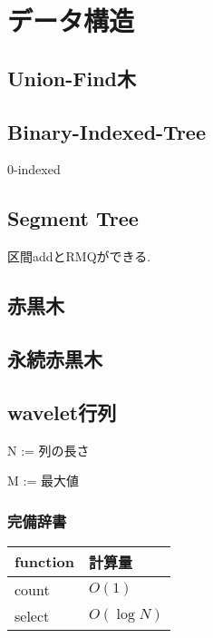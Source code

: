 \section{データ構造}
\subsection{Union-Find木}

\subsection{Binary-Indexed-Tree}
0-indexed

\subsection{Segment Tree}
区間addとRMQができる.

\subsection{赤黒木}

\subsection{永続赤黒木}

\subsection{wavelet行列}
N := 列の長さ\par
M := 最大値\\
\subsubsection{完備辞書}
\begin{table} [htb]
  \begin{tabular} { |l|l| } \hline
    function & 計算量 \\ \hline
    count & $O(1)$ \\ \hline
    select & $O(\log N)$ \\ \hline
  \end{tabular}
\end{table}

